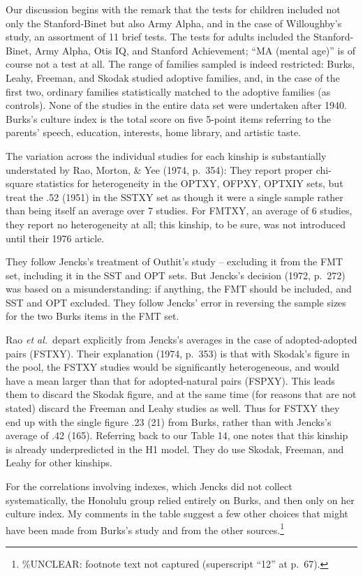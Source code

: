 ﻿\documentclass[12pt]{article}
\begin{document}
Our discussion begins with the remark that the tests for children included not only the Stanford-Binet but also Army Alpha, and in the case of Willoughby's study, an assortment of 11 brief tests. The tests for adults included the Stanford-Binet, Army Alpha, Otis IQ, and Stanford Achievement; ``MA (mental age)'' is of course not a test at all. The range of families sampled is indeed restricted: Burks, Leahy, Freeman, and Skodak studied adoptive families, and, in the case of the first two, ordinary families statistically matched to the adoptive families (as controls). None of the studies in the entire data set were undertaken after 1940. Burks's culture index is the total score on five 5-point items referring to the parents' speech, education, interests, home library, and artistic taste.

The variation across the individual studies for each kinship is substantially understated by Rao, Morton, \& Yee (1974, p.\ 354): They report proper chi-square statistics for heterogeneity in the OPTXY, OFPXY, OPTXIY sets, but treat the .52 (1951) in the SSTXY set as though it were a single sample rather than being itself an average over 7 studies. For FMTXY, an average of 6 studies, they report no heterogeneity at all; this kinship, to be sure, was not introduced until their 1976 article.

They follow Jencks's treatment of Outhit's study -- excluding it from the FMT set, including it in the SST and OPT sets. But Jencks's decision (1972, p.\ 272) was based on a misunderstanding: if anything, the FMT should be included, and SST and OPT excluded. They follow Jencks' error in reversing the sample sizes for the two Burks items in the FMT set.

Rao \emph{et al.}\ depart explicitly from Jencks's averages in the case of adopted-adopted pairs (FSTXY). Their explanation (1974, p.\ 353) is that with Skodak's figure in the pool, the FSTXY studies would be significantly heterogeneous, and would have a mean larger than that for adopted-natural pairs (FSPXY). This leads them to discard the Skodak figure, and at the same time (for reasons that are not stated) discard the Freeman and Leahy studies as well. Thus for FSTXY they end up with the single figure .23 (21) from Burks, rather than with Jencks's average of .42 (165). Referring back to our Table 14, one notes that this kinship is already underpredicted in the H1 model. They do use Skodak, Freeman, and Leahy for other kinships.

For the correlations involving indexes, which Jencks did not collect systematically, the Honolulu group relied entirely on Burks, and then only on her culture index. My comments in the table suggest a few other choices that might have been made from Burks's study and from the other sources.\footnote{\%UNCLEAR: footnote text not captured (superscript ``12'' at p.\ 67).}
\end{document}

